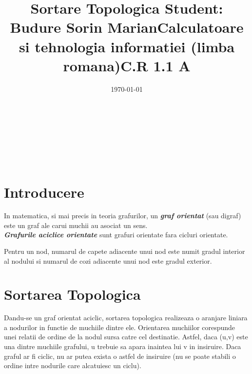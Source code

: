 \documentclass[14pt]{article}
\begin{document}
\title{\huge Sortare Topologica }
\date{\today}
\maketitle
\begin{center}
\vspace{30 mm}

\title{\huge Student: Budure Sorin Marian}
\\\vspace{10 mm}
\title{\huge Calculatoare si tehnologia informatiei (limba romana)}
\\\vspace{10 mm}
\title{\huge C.R 1.1 A}
\\\vspace{10 mm}
\date{}
\maketitle

\newpage
\section*{Introducere}
\end{center}
\vspace{20 mm}

In matematica, si mai precis in teoria grafurilor, un  \textbf{\textit{graf orientat}} (sau digraf) este un graf ale carui muchii au asociat un sens.
\\
\textbf{\textit{Grafurile aciclice orientate}} sunt grafuri orientate fara cicluri orientate.


\vspace{10 mm}

Pentru un nod, numarul de capete adiacente unui nod este numit gradul interior al nodului si numarul de cozi adiacente unui nod este gradul exterior.

\vspace{10 mm}

\section*{Sortarea Topologica}
\vspace{10 mm}

Dandu-se un graf orientat aciclic, sortarea topologica realizeaza o aranjare liniara a nodurilor in functie de muchiile dintre ele. Orientarea muchiilor corespunde unei relatii de ordine de la nodul sursa catre cel destinatie. Astfel, daca (u,v) este una dintre muchiile grafului, u trebuie sa apara inaintea lui v in insiruire. Daca graful ar fi ciclic, nu ar putea exista o astfel de insiruire (nu se poate stabili o ordine intre nodurile care alcatuiesc un ciclu). 
\end{document}
